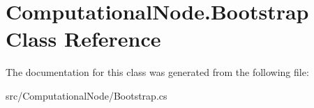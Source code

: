 \hypertarget{class_computational_node_1_1_bootstrap}{}\section{Computational\+Node.\+Bootstrap Class Reference}
\label{class_computational_node_1_1_bootstrap}


The documentation for this class was generated from the following file\+:\begin{DoxyCompactItemize}
\item 
src/\+Computational\+Node/Bootstrap.\+cs\end{DoxyCompactItemize}

